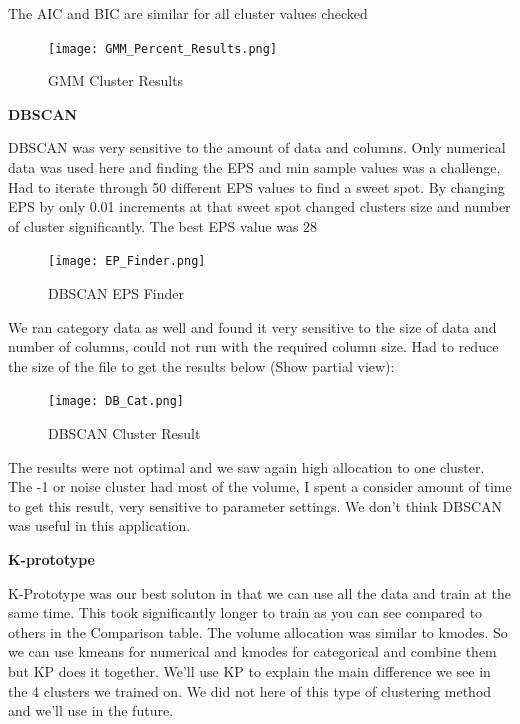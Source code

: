 \documentclass[conference]{IEEEtran}
\begin{document}
\begin{center}
The AIC and BIC are similar for all cluster values checked

\begin{figure}[!h]
	\texttt{[image: GMM\_Percent\_Results.png]}
	\caption{GMM Cluster Results}
	\label{fig: GMM Cluster Results (Partial View)}
 \end{figure}
\begin{center} 

\textbf{DBSCAN} 
\end{center}
DBSCAN was very sensitive to the amount of data and columns.  Only numerical data was used here and finding the EPS and min sample values was a challenge,  Had to iterate through 50 different EPS values to find a sweet spot.  By changing EPS by only 0.01 increments at that sweet spot changed clusters size and number of cluster significantly. The best EPS value was 28

\begin{figure}[!h]
	\texttt{[image: EP\_Finder.png]}
	\caption{DBSCAN EPS Finder}
	\label{fig: EPS Finder}
 \end{figure}
We ran category data as well and found it very sensitive to the size of data and number of columns, could not run with the required column size.  Had to reduce the size of the file to get the results below (Show partial view):

\begin{figure}[!h]
	\texttt{[image: DB\_Cat.png]}
	\caption{DBSCAN Cluster Result}
	\label{fig: DBSCAN Cluster Result}
 \end{figure}
The results were not optimal and we saw again high allocation to one cluster. The -1 or noise cluster had most of the volume,  I spent a consider amount of time to get this result, very sensitive to parameter settings.  We don't think DBSCAN was useful in this application.

\begin{center} 
\textbf{K-prototype} 
\end{center}

K-Prototype was our best soluton in that we can use all the data and train at the same time.  This took significantly longer to train as you can see compared to others in the Comparison table.  The volume allocation was similar to kmodes.  So we can use kmeans for numerical and kmodes for categorical and combine them but KP does it together.  We'll use KP to explain the main difference we see in the 4 clusters we trained on. We did not here of this type of clustering method and we'll use in the future.


\end{center}
\end{document}
